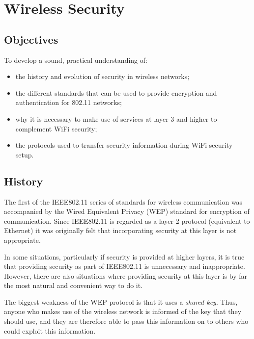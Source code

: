 \chapter{Wireless Security}\label{security}

\minitoc 

\clearpage
\section*{Objectives}
To develop a sound, practical understanding of:
\begin{itemize}

\item the history and evolution of security in wireless networks;

\item the different standards that can be used to provide encryption and authentication for 802.11 networks;

\item why it is necessary to make use of services at layer 3 and higher to complement WiFi security;

\item the protocols used to transfer security information during WiFi security setup.

\end{itemize}


\section{History}
The first of the IEEE802.11 series of standards for wireless communication was accompanied by the Wired Equivalent Privacy (WEP) standard for encryption of communication. Since IEEE802.11 is regarded as a layer 2 protocol (equivalent to Ethernet) it was originally felt that incorporating security at this layer is not appropriate.

In some situations, particularly if security is provided at higher layers, it is true that providing security as part of IEEE802.11 is unnecessary and inappropriate. However, there are also situations where providing security at this layer is by far the most natural and convenient way to do it.

The biggest weakness of the WEP protocol is that it uses a {\em shared key}. Thus, anyone who makes use of the wireless network is informed of the key that they should use, and they are therefore able to pass this information on to others who could exploit this information.

